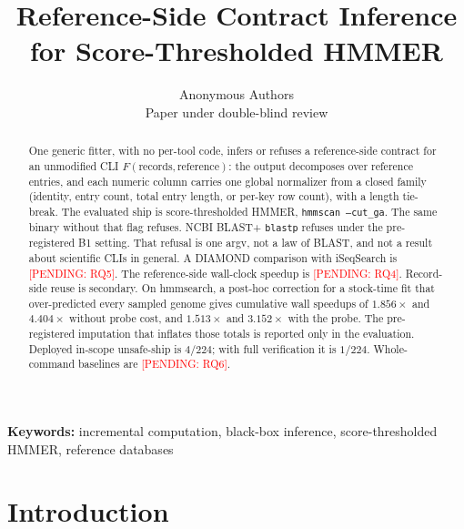 \documentclass[letterpaper,twocolumn,10pt]{article}
\newcommand{\pending}[1]{\textcolor{red}{[PENDING: #1]}}
\begin{document}
\date{}

\title{Reference-Side Contract Inference\\ for Score-Thresholded HMMER}

\author{%
{\rm Anonymous Authors}\\
Paper under double-blind review
}

\maketitle

\begin{abstract}
One generic fitter, with no per-tool code, infers or refuses a reference-side contract for an unmodified CLI $F(\mathrm{records},\mathrm{reference})$: the output decomposes over reference entries, and each numeric column carries one global normalizer from a closed family (identity, entry count, total entry length, or per-key row count), with a length tie-break.
The evaluated ship is score-thresholded HMMER, \texttt{hmmscan --cut\_ga}.
The same binary without that flag refuses.
NCBI BLAST+ \texttt{blastp} refuses under the pre-registered B1 setting.
That refusal is one argv, not a law of BLAST, and not a result about scientific CLIs in general.
A DIAMOND comparison with iSeqSearch is
\pending{RQ5}.
The reference-side wall-clock speedup is
\pending{RQ4}.
Record-side reuse is secondary.
On hmmsearch, a post-hoc correction for a stock-time fit that over-predicted every sampled genome gives cumulative wall speedups of
$1.856\times$ and $4.404\times$
without probe cost, and
$1.513\times$ and $3.152\times$
with the probe.
The pre-registered imputation that inflates those totals is reported only in the evaluation.
Deployed in-scope unsafe-ship is
$4/224$;
with full verification it is
$1/224$.
Whole-command baselines are
\pending{RQ6}.
\end{abstract}

\noindent\textbf{Keywords:} incremental computation, black-box inference, score-thresholded HMMER, reference databases

\section{Introduction}
\label{sec:intro}
\end{document}
